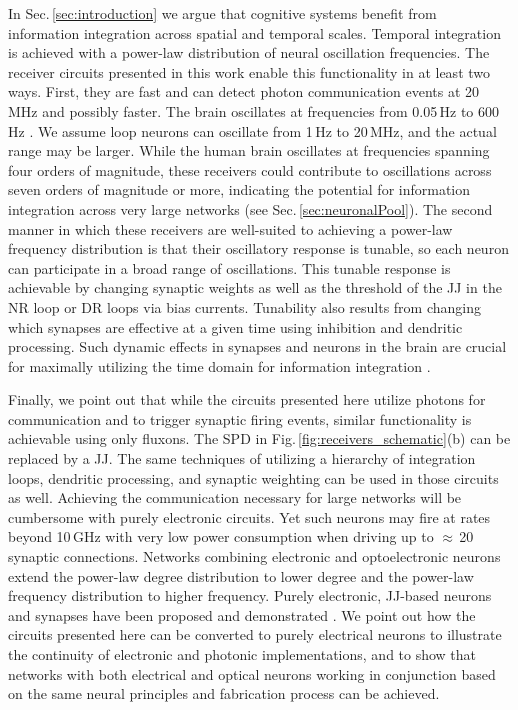 \documentclass[aip,amsmath,amssymb,reprint,nofootinbib]{revtex4-1}
\begin{document}
In Sec.\,\ref{sec:introduction} we argue that cognitive systems benefit from information integration across spatial and temporal scales. Temporal integration is achieved with a power-law distribution of neural oscillation frequencies. The receiver circuits presented in this work enable this functionality in at least two ways. First, they are fast and can detect photon communication events at 20 MHz and possibly faster. The brain oscillates at frequencies from 0.05\,Hz to 600\,Hz \cite{budr2004}. We assume loop neurons can oscillate from 1\,Hz to 20\,MHz, and the actual range may be larger. While the human brain oscillates at frequencies spanning four orders of magnitude, these receivers could contribute to oscillations across seven orders of magnitude or more, indicating the potential for information integration across very large networks \cite{stsa2000} (see Sec.\,\ref{sec:neuronalPool}). The second manner in which these receivers are well-suited to achieving a power-law frequency distribution is that their oscillatory response is tunable, so each neuron can participate in a broad range of oscillations. This tunable response is achievable by changing synaptic weights as well as the threshold of the JJ in the NR loop or DR loops via bias currents. Tunability also results from changing which synapses are effective at a given time using inhibition and dendritic processing. Such dynamic effects in synapses and neurons in the brain are crucial for maximally utilizing the time domain for information integration \cite{bu2006}.

Finally, we point out that while the circuits presented here utilize photons for communication and to trigger synaptic firing events, similar functionality is achievable using only fluxons. The SPD in Fig.\,\ref{fig:receivers_schematic}(b) can be replaced by a JJ. The same techniques of utilizing a hierarchy of integration loops, dendritic processing, and synaptic weighting can be used in those circuits as well. Achieving the communication necessary for large networks \cite{sh2018ICRC} will be cumbersome with purely electronic circuits. Yet such neurons may fire at rates beyond 10\,GHz with very low power consumption when driving up to $\approx$\,20 synaptic connections. Networks combining electronic and optoelectronic neurons extend the power-law degree distribution to lower degree and the power-law frequency distribution to higher frequency. Purely electronic, JJ-based neurons and synapses have been proposed \cite{hias2007,crsc2010,ru2016} and demonstrated \cite{segu2014,scdo2018}. We point out how the circuits presented here can be converted to purely electrical neurons to illustrate the continuity of electronic and photonic implementations, and to show that networks with both electrical and optical neurons working in conjunction based on the same neural principles and fabrication process can be achieved.
\end{document}
